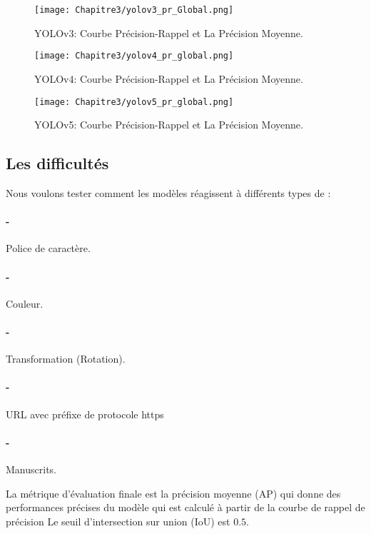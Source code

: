      \begin{figure}[H]
               \centering
               \texttt{[image: Chapitre3/yolov3\_pr\_Global.png]}
               \caption{YOLOv3: Courbe Précision-Rappel et La Précision Moyenne.}
               \label{y3_pr}
               \end{figure}
     \begin{figure}[H]
               \centering
               \texttt{[image: Chapitre3/yolov4\_pr\_global.png]}
               \caption{YOLOv4: Courbe Précision-Rappel et La Précision Moyenne.}
               \label{y4_pr}
               \end{figure}
     \begin{figure}[H]
               \centering
               \texttt{[image: Chapitre3/yolov5\_pr\_global.png]}
               \caption{YOLOv5: Courbe Précision-Rappel et La Précision Moyenne.}
               \label{y5_pr}
               \end{figure}
     
     \subsection{Les difficultés}

          Nous voulons tester comment les modèles réagissent à différents types de :
          \paragraph{-} Police de caractère.
          \paragraph{-} Couleur.
          \paragraph{-} Transformation (Rotation).
          \paragraph{-} URL avec préfixe de protocole https
          \paragraph{-} Manuscrits.
               
          La métrique d'évaluation finale est la précision moyenne (AP) qui donne des performances précises du modèle qui est calculé à partir de la courbe de rappel de précision
          Le seuil d'intersection sur union (IoU) est $0.5$.
